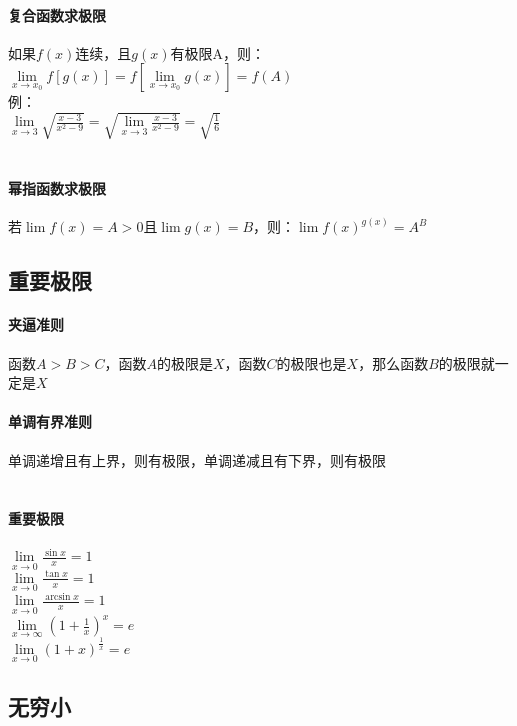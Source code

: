 \documentclass{article}
\begin{document}
\begin{flushleft}
\paragraph{复合函数求极限}
如果$f(x)$连续，且$g(x)$有极限A，则：\\
$\lim\limits_{x\to x_0} f[g(x)]=f[\lim\limits_{x\to x_0}g(x)]=f(A)$\\
例：\\
$\lim\limits_{x\to 3} \sqrt{\frac{x-3}{x^2-9}}= \sqrt{\lim\limits_{x\to 3} \frac{x-3}{x^2-9}}=\sqrt{\frac{1}{6}}$\\
~\\
\paragraph{幂指函数求极限}
若$\lim f(x)=A>0$且$\lim g(x)=B$，则：$\lim f(x)^{g(x)}=A^B$\\

\subsection{重要极限}

\paragraph{夹逼准则}
函数$A>B>C$，函数$A$的极限是$X$，函数$C$的极限也是$X$，那么函数$B$的极限就一定是$X$\\
\paragraph{单调有界准则}
单调递增且有上界，则有极限，单调递减且有下界，则有极限\\
~\\
\paragraph{重要极限}
$\lim\limits_{x\to 0} \frac{\sin x}{x}=1$\\
$\lim\limits_{x\to 0} \frac{\tan x}{x}=1$\\
$\lim\limits_{x\to 0} \frac{\arcsin x}{x}=1$\\
$\lim\limits_{x\to \infty} (1+\frac{1}{x})^x=e$\\
$\lim\limits_{x\to 0} (1+x)^{\frac{1}{x}}=e$\\

\subsection{无穷小}


\end{flushleft}
\end{document}
